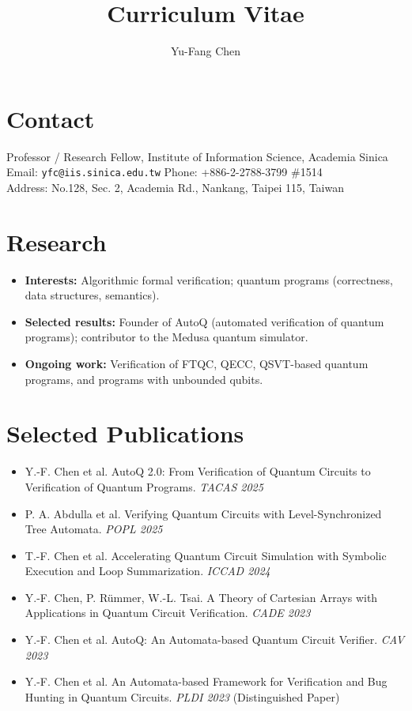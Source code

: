 \documentclass[a4paper,11pt]{article}
\title{\vspace{-2em}Curriculum Vitae}
\author{Yu-Fang Chen}
\date{}
\begin{document}
\maketitle
\vspace{-2em}

\section*{Contact}
Professor / Research Fellow, Institute of Information Science, Academia Sinica \\
Email: \texttt{yfc@iis.sinica.edu.tw} \quad
Phone: +886-2-2788-3799 \#1514 \\
Address: No.128, Sec. 2, Academia Rd., Nankang, Taipei 115, Taiwan

\section*{Research}
\begin{itemize}
  \item \textbf{Interests:} Algorithmic formal verification; quantum programs (correctness, data structures, semantics).
  \item \textbf{Selected results:} Founder of AutoQ (automated verification of quantum programs); contributor to the Medusa quantum simulator.
  \item \textbf{Ongoing work:} Verification of FTQC, QECC, QSVT-based quantum programs, and programs with unbounded qubits.
\end{itemize}

\section*{Selected Publications}
\begin{itemize}
  \item Y.-F. Chen et al. AutoQ 2.0: From Verification of Quantum Circuits to Verification of Quantum Programs. \textit{TACAS 2025}
  \item P. A. Abdulla et al. Verifying Quantum Circuits with Level-Synchronized Tree Automata. \textit{POPL 2025}
  \item T.-F. Chen et al. Accelerating Quantum Circuit Simulation with Symbolic Execution and Loop Summarization. \textit{ICCAD 2024}
  \item Y.-F. Chen, P. Rümmer, W.-L. Tsai. A Theory of Cartesian Arrays with Applications in Quantum Circuit Verification. \textit{CADE 2023}
  \item Y.-F. Chen et al. AutoQ: An Automata-based Quantum Circuit Verifier. \textit{CAV 2023}
  \item Y.-F. Chen et al. An Automata-based Framework for Verification and Bug Hunting in Quantum Circuits. \textit{PLDI 2023} (Distinguished Paper)
\end{itemize}
\end{document}
